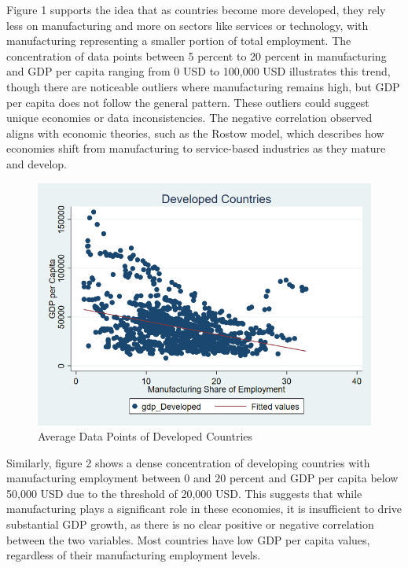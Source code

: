 \documentclass[12pt]{article}
\begin{document}
Figure 1 supports the idea that as countries become more developed, they rely less on manufacturing and more on sectors like services or technology, with manufacturing representing a smaller portion of total employment. The concentration of data points between 5 percent to 20 percent in manufacturing and GDP per capita ranging from 0 USD to 100,000 USD illustrates this trend, though there are noticeable outliers where manufacturing remains high, but GDP per capita does not follow the general pattern. These outliers could suggest unique economies or data inconsistencies. The negative correlation observed aligns with economic theories, such as the Rostow model, which describes how economies shift from manufacturing to service-based industries as they mature and develop.

\begin{figure}[htbp]
    \centering
    \includegraphics[width=0.75\linewidth]{Reproducibility Package/Variable Graphs/Developed New.png}
    \caption{Average Data Points of Developed Countries}
    \label{fig:Developed-label}
\end{figure}

Similarly, figure 2 shows a dense concentration of developing countries with manufacturing employment between 0 and 20 percent and GDP per capita below 50,000 USD due to the threshold of 20,000 USD. This suggests that while manufacturing plays a significant role in these economies, it is insufficient to drive substantial GDP growth, as there is no clear positive or negative correlation between the two variables. 
Most countries have low GDP per capita values, regardless of their manufacturing employment levels.
\end{document}

